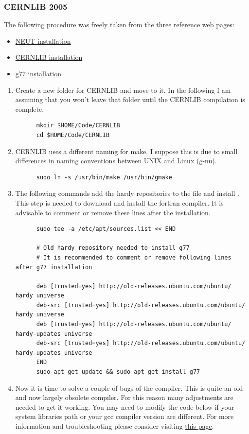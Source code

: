 \subsubsection{CERNLIB 2005}\label{sec:cernlib-2005}
The following procedure was freely taken from the three reference web
pages:
\begin{itemize}
\item
  \href{https://www.t2k.org/asg/xsec/niwgdocs/neut/install_neut}{NEUT
    installation}
\item
  \href{https://www-zeuthen.desy.de/linear_collider/cernlib/new/cernlib_2005.html}%
  {CERNLIB installation }
\item
  \href{http://seanelvidge.com/2017/01/install-g77-on-ubuntu-14-04/}{g77
    installation}
\end{itemize}
\begin{enumerate}[resume]
\item Create a new folder for CERNLIB and move to it. In the following
  I am assuming that you won't leave that folder until the CERNLIB
  compilation is complete.
\begin{lstlisting}
      mkdir $HOME/Code/CERNLIB
      cd $HOME/Code/CERNLIB
\end{lstlisting}
\item CERNLIB uses a different naming for make. I suppose this is due
  to small differences in naming conventions between UNIX and Linux
  (g-nu).%
\begin{lstlisting}
      sudo ln -s /usr/bin/make /usr/bin/gmake
\end{lstlisting}
\item The following commands add the hardy repositories to the
   file and install . This
  step is needed to download and install the fortran 
  compiler. It is advisable to comment or remove these lines after the
   installation.%
\begin{lstlisting}
      sudo tee -a /etc/apt/sources.list << END

      # Old hardy repository needed to install g77
      # It is recommended to comment or remove following lines after g77 installation
      
      deb [trusted=yes] http://old-releases.ubuntu.com/ubuntu/ hardy universe
      deb-src [trusted=yes] http://old-releases.ubuntu.com/ubuntu/ hardy universe
      deb [trusted=yes] http://old-releases.ubuntu.com/ubuntu/ hardy-updates universe
      deb-src [trusted=yes] http://old-releases.ubuntu.com/ubuntu/ hardy-updates universe
      END
      sudo apt-get update && sudo apt-get install g77
\end{lstlisting}
\item Now it is time to solve a couple of bugs of the 
  compiler. This is quite an old and now largely obsolete
  compiler. For this reason many adjustments are needed to get it
  working. You may need to modify the code below if your system libraries
  path or your gcc compiler version are different. For more
  information and troubleshooting please consider visiting
  \href{http://seanelvidge.com/2017/01/install-g77-on-ubuntu-14-04/}{this
    page}.


\end{enumerate}

